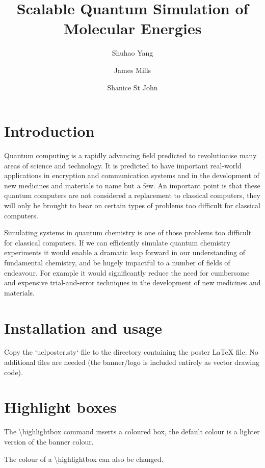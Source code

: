 \documentclass[14pt,landscape,color=UCLdarkred,margin=3cm]{uclposter}
\title{Scalable Quantum Simulation of Molecular Energies}
\author[1 *]{Shuhao Yang}
\author[1,2]{James Mills}
\author[1,2]{Shanice St John}
\affil[1]{Department of LaTeX Studies, UCL}
\affil[2]{TikZ, UCL}
\affil[*]{a.example@ucl.ac.uk}
\begin{document}
\maketitle

\begin{multicols}{3}

\section*{Introduction}
Quantum computing is a rapidly advancing field predicted to revolutionise many
areas of science and technology. It is predicted to have important real-world applications in encryption and communication systems and in the development of new medicines and materials to name but a few. An important point is that these quantum computers are not considered a replacement to classical computers, they will only be brought to bear on certain types of problems too difficult for classical computers.

Simulating systems in quantum chemistry is one of those problems too difficult for classical computers. If we can efficiently simulate quantum chemistry experiments it would enable a dramatic leap forward in our understanding of fundamental chemistry, and be hugely impactful to a number of fields of endeavour. For example it would significantly reduce the need for cumbersome and expensive trial-and-error techniques in the development of new medicines and materials.

\section*{Installation and usage}

Copy the `uclposter.sty` file to the directory containing the poster LaTeX file.
No additional files are needed (the banner/logo is included entirely as vector drawing code).

\section*{Highlight boxes}

\begin{highlightbox}
	The \textbackslash highlightbox command inserts a coloured box, the default colour is a lighter version of the banner colour.
\end{highlightbox}

\begin{highlightbox}
	The colour of a \textbackslash highlightbox can also be changed.
\end{highlightbox}


\end{multicols}
\end{document}
